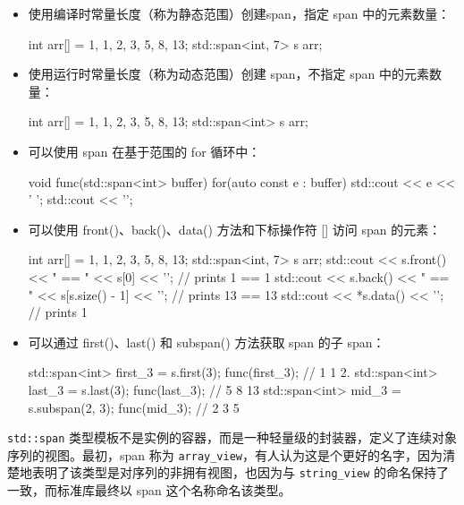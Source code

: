 \begin{itemize}
\item
使用编译时常量长度（称为静态范围）创建span，指定 span 中的元素数量：

\begin{cpp}
int arr[] = {1, 1, 2, 3, 5, 8, 13};
std::span<int, 7> s {arr};
\end{cpp}

\item
使用运行时常量长度（称为动态范围）创建 span，不指定 span 中的元素数量：

\begin{cpp}
int arr[] = {1, 1, 2, 3, 5, 8, 13};
std::span<int> s {arr};
\end{cpp}

\item
可以使用 span 在基于范围的 for 循环中：

\begin{cpp}
void func(std::span<int> buffer)
{
    for(auto const e : buffer)
    std::cout << e << ' ';
    std::cout << '\n';
}
\end{cpp}

\item
可以使用 front()、back()、data() 方法和下标操作符 [] 访问 span 的元素：

\begin{cpp}
int arr[] = {1, 1, 2, 3, 5, 8, 13};
std::span<int, 7> s {arr};
std::cout << s.front() << " == " << s[0] << '\n';
// prints 1 == 1
std::cout << s.back() << " == " << s[s.size() - 1] << '\n';
// prints 13 == 13
std::cout << *s.data() << '\n';
// prints 1
\end{cpp}

\item
可以通过 first()、last() 和 subspan() 方法获取 span 的子 span：

\begin{cpp}
std::span<int> first_3 = s.first(3);
func(first_3);  // 1 1 2.
std::span<int> last_3 = s.last(3);
func(last_3);   // 5 8 13
std::span<int> mid_3 = s.subspan(2, 3);
func(mid_3);    // 2 3 5
\end{cpp}
\end{itemize}


\verb|std::span| 类型模板不是实例的容器，而是一种轻量级的封装器，定义了连续对象序列的视图。最初，span 称为 \verb|array_view|，有人认为这是个更好的名字，因为清楚地表明了该类型是对序列的非拥有视图，也因为与 \verb|string_view| 的命名保持了一致，而标准库最终以 span 这个名称命名该类型。

